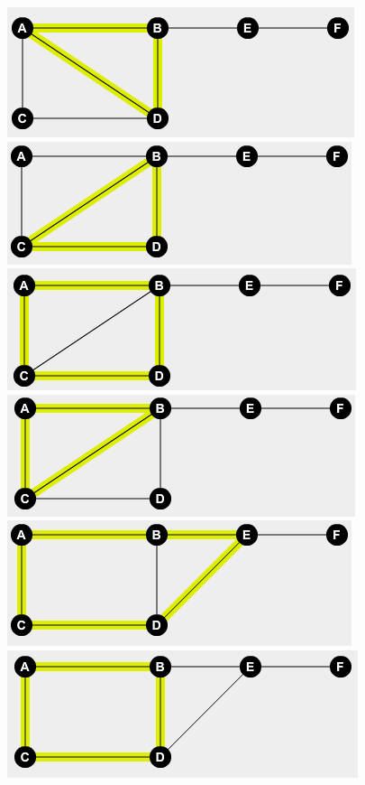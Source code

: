 \documentclass{article}
\begin{document}
	\newline
	\includegraphics{6Cycles3}
	\newline
	\newline
	\includegraphics{6Cycles4}
	\newline
	\includegraphics{6Cycles5}
	\newline
	\includegraphics{6Cycles6}
	\newline
	\newline
	\includegraphics{6Cycles7}
	\newline
	\includegraphics{6Cycles8}
\end{document}
